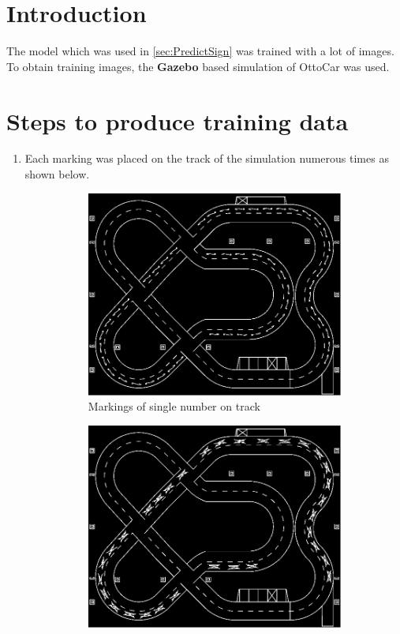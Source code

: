 \section{Introduction}
The model which was used in \autoref{sec:PredictSign} was trained with a lot of images. To obtain training images, the \textbf{Gazebo} based simulation of OttoCar was used.

\section{Steps to produce training data}
\begin{enumerate}
    \item Each marking was placed on the track of the simulation numerous times as shown below.
    \label{enum:StepsToTrainingData1}
    \begin{figure}[h!]
    \begin{subfigure}{0.5\textwidth}
    \centering
    \includegraphics[scale=1]{images/SingleNumberOnTrack.png} 
    \caption{Markings of single number on track}
    \end{subfigure}
    \begin{subfigure}{0.5\textwidth}
    \centering
    \includegraphics[scale=1]{images/SpeedEndOnTrack.png} 

\end{subfigure}
\end{figure}
\end{enumerate}

